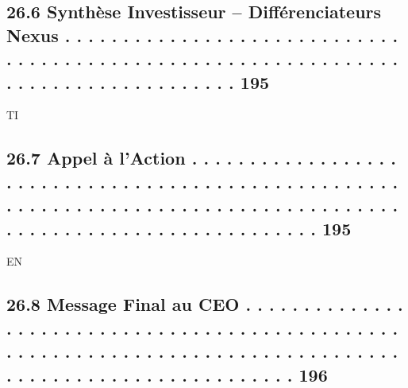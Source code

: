 \documentclass[12pt,landscape,a4paper]{article}
\begin{document}
\subsection{26.6    Synthèse Investisseur – Différenciateurs Nexus . . . . . . . . . . . . . . . . . . . . . . . . . . . . . . . . . . . . . . . . . . . . . . . . . . . . . . . . . . . . . . . . . . . . . . . . . . . . . . . . . . . 195}
\vspace{0.5em}
\vspace{0.5em}
\vspace{0.5em}
\vspace{0.5em}
TI\\
\subsection{26.7    Appel à l’Action . . . . . . . . . . . . . . . . . . . . . . . . . . . . . . . . . . . . . . . . . . . . . . . . . . . . . . . . . . . . . . . . . . . . . . . . . . . . . . . . . . . . . . . . . . . . . . . . . . . . . . . . . . . . . . . . . 195}
\vspace{0.5em}
\vspace{0.5em}
\vspace{0.5em}
\vspace{0.5em}
EN\\
\subsection{26.8    Message Final au CEO . . . . . . . . . . . . . . . . . . . . . . . . . . . . . . . . . . . . . . . . . . . . . . . . . . . . . . . . . . . . . . . . . . . . . . . . . . . . . . . . . . . . . . . . . . . . . . . . . . . . . . . . . . . 196}
\end{document}
